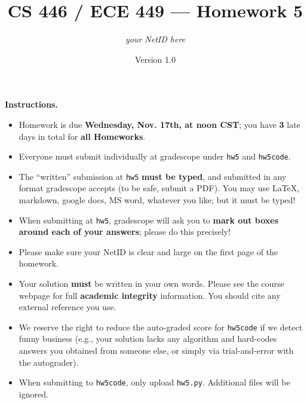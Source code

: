 \documentclass{article}
\title{CS 446 / ECE 449 --- Homework 5}
\author{\emph{your NetID here}}
\date{Version 1.0}
\theoremstyle{definition}
\theoremstyle{remark}
\begin{document}
\maketitle

\noindent\textbf{Instructions.}
\begin{itemize}
   \item
            Homework is due \textbf{Wednesday, Nov. 17th, at noon CST}; you have \textbf{3} late days in total for \textbf{all Homeworks}.
        
          \item
            Everyone must submit individually at gradescope under \texttt{hw5} and \texttt{hw5code}.
        
          \item
            The ``written'' submission at \texttt{hw5} \textbf{must be typed}, and submitted in
            any format gradescope accepts (to be safe, submit a PDF).  You may use \LaTeX, markdown,
            google docs, MS word, whatever you like; but it must be typed!
        
          \item
            When submitting at \texttt{hw5}, gradescope will ask you to \textbf{mark out boxes
            around each of your answers}; please do this precisely!
        
          \item
            Please make sure your NetID is clear and large on the first page of the homework.
        
          \item
            Your solution \textbf{must} be written in your own words.
            Please see the course webpage for full \textbf{academic integrity} information.
            You should cite any external reference you use.
        
          \item
            We reserve the right to reduce the auto-graded score for
            \texttt{hw5code} if we detect funny business (e.g., your solution
            lacks any algorithm and hard-codes answers you obtained from
            someone else, or simply via trial-and-error with the autograder).
            
          \item
           When submitting to \texttt{hw5code}, only upload \texttt{hw5.py}. Additional files will be ignored.
        
\end{itemize}
        
       
\begin{enumerate}[font={\Large\bfseries},left=0pt]




 
\end{enumerate}
\end{document}
